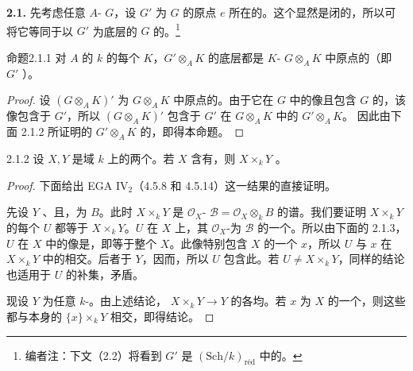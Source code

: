 \textbf{2.1.} 先考虑任意 $A$- $G$，设 $G'$ 为 $G$ 的原点 $e$ 所在的。这个显然是闭的，所以可将它等同于以 $G'$ 为底层的 $G$ 的。\footnote{编者注：下文（2.2）将看到 $G'$ 是 $(\mathrm{Sch}/k)_{\mathrm{r\text{é}d}}$ 中的。}
\begin{SGAresult}{命题}{2.1.1}
对 $A$ 的 $k$ 的每个 $K$，$G'\otimes_A K$ 的底层都是 $K$- $G\otimes_A K$ 中原点的（即 $G'$ ）。
\end{SGAresult}
\begin{proof}
设 $(G\otimes_A K)'$ 为 $G\otimes_A K$ 中原点的。由于它在 $G$ 中的像且包含 $G$ 的，该像包含于 $G'$，所以 $(G\otimes_A K)'$ 包含于 $G'$ 在 $G\otimes_A K$ 中的 $G'\otimes_A K$。
因此由下面 2.1.2 所证明的 $G'\otimes_A K$ 的，即得本命题。
\end{proof}
\begin{SGAresult}{}{2.1.2}
设 $X,Y$ 是域 $k$ 上的两个。若 $X$ 含有，则 $X\times_k Y$ 。
\end{SGAresult}
\begin{proof}
下面给出 EGA IV$_2$（4.5.8 和 4.5.14）这一结果的直接证明。

先设 $Y$ 、且，为 $B$。此时 $X\times_k Y$ 是 $\mathcal O_X$- $\mathcal B=\mathcal O_X\otimes_k B$ 的谱。我们要证明 $X\times_k Y$ 的每个 $U$ 都等于 $X\times_k Y$。$U$ 在 $X$ 上，其 $\mathcal O_X$-为 $\mathcal B$ 的一个。所以由下面的 2.1.3，$U$ 在 $X$ 中的像是，即等于整个 $X$。此像特别包含 $X$ 的一个 $x$，所以 $U$ 与 $x$ 在 $X\times_k Y$ 中的相交。后者于 $Y$，因而，所以 $U$ 包含此。若 $U\ne X\times_k Y$，同样的结论也适用于 $U$ 的补集，矛盾。

现设 $Y$ 为任意 $k$-。由上述结论， $X\times_k Y\to Y$ 的各均。若 $x$ 为 $X$ 的一个，则这些都与本身的 $\{x\}\times_k Y$ 相交，即得结论。
\end{proof}
